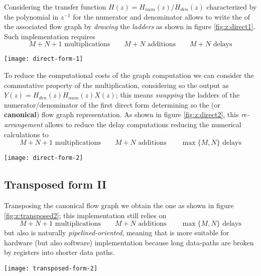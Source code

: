 		Considering the transfer function $H(z) = H_{num}(z)/H_{den}(z)$ characterized by the polynomial in $z^{-1}$ for the numerator and denominator allows to write the  of the associated flow graph by \textit{drawing} the \textit{ladders} as shown in figure \ref{fig:z:direct1}. Such implementation requires
		\[ M+N+1 \text{ multiplications} \qquad M+N \text{ additions} \qquad M+N\text{ delays} \]
		
		\begin{SCfigure}[2][bht]
			\centering \texttt{[image: direct-form-1]}
			\caption{first direct form flow graph representation for discrete-time systems.} \label{fig:z:direct1}
		\end{SCfigure}
	
		To reduce the computational costs of the graph computation we can consider the commutative property of the multiplication, considering so the output as $Y(z) = H_{den}(z) H_{num}(z)X(z)$; this means \textit{swapping} the ladders of the numerator/denominator of the first direct form determining so the  (or \textbf{canonical}) flow graph representation. As shown in figure \ref{fig:z:direct2}, this \textit{re-arrangement} allows to reduce the delay computations reducing the numerical calculations to
		\[ M+N+1 \text{ multiplications} \qquad M+N \text{ additions} \qquad \max\{ M,N \}\text{ delays} \]
		
		\begin{SCfigure}[2][bht]
			\centering \texttt{[image: direct-form-2]}
			\caption{second direct form flow graph representation for discrete-time systems.} \label{fig:z:direct2}
		\end{SCfigure}
		
	\subsection{Transposed form II}
		Transposing the canonical flow graph we obtain the  one as shown in figure \ref{fig:z:transposed2}; this implementation still relies on
		\[ M+N+1 \text{ multiplications} \qquad M+N \text{ additions} \qquad \max\{ M,N \}\text{ delays} \]
		but also is naturally \textit{pipelined-oriented}, meaning that is more suitable for hardware (but also software) implementation because long data-paths are broken by registers into shorter data paths.
		
		\begin{SCfigure}[2][bht]
			\centering \texttt{[image: transposed-form-2]}
			\caption{flow graph of transposed form II obtained as transosition of the canonical graph (figure \ref{fig:z:direct2}).} \label{fig:z:transposed2}
		\end{SCfigure}
		
		
		
		
		
		
		
		
		
		
		
		
		
		
		
		
		
		
		
		
		
		
		
		
		
		